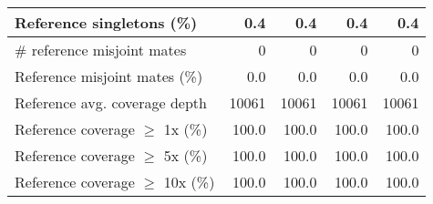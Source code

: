 \documentclass[12pt,a4paper]{article}
\begin{document}
\begin{table}[ht]
\begin{center}
\begin{tabular}{|l*{4}{|r}|}
Reference singletons (\%) & 0.4 & 0.4 & 0.4 & 0.4 \\ \hline
\# reference misjoint mates & 0 & 0 & 0 & 0 \\ \hline
Reference misjoint mates (\%) & 0.0 & 0.0 & 0.0 & 0.0 \\ \hline
Reference avg. coverage depth & 10061 & 10061 & 10061 & 10061 \\ \hline
Reference coverage $\geq$ 1x (\%) & 100.0 & 100.0 & 100.0 & 100.0 \\ \hline
Reference coverage $\geq$ 5x (\%) & 100.0 & 100.0 & 100.0 & 100.0 \\ \hline
Reference coverage $\geq$ 10x (\%) & 100.0 & 100.0 & 100.0 & 100.0 \\ \hline
\end{tabular}
\end{center}
\end{table}
\end{document}

